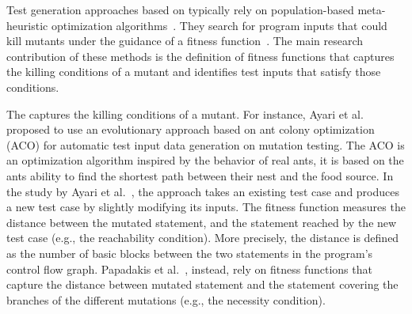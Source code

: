 Test generation approaches based on  typically rely on population-based meta-heuristic optimization algorithms~\cite{harman2011strong}. 
They search for program inputs that could kill mutants under the guidance of a fitness function~\cite{harman2011strong}. 
The main research contribution of these methods is the definition of fitness functions that captures the killing conditions of a mutant and identifies test inputs that satisfy those conditions.

The  captures the killing conditions of a mutant. For instance, Ayari et al.~\cite{ayari2007automatic} proposed to use an evolutionary approach based on ant colony optimization (ACO) for automatic test input data generation on mutation testing. The ACO is an optimization algorithm inspired by the behavior of real ants, it is based on the ants ability to find the shortest path between their nest and the food source. In the study by Ayari et al.~\cite{ayari2007automatic}, the approach takes an existing test case and produces a new test case by slightly modifying its inputs. 
The fitness function measures the distance between the mutated statement, and the statement reached by the new test case (e.g., the reachability condition). More precisely, the distance is defined as the number of basic blocks between the two statements in the program's control flow graph.
Papadakis et al.~\cite{papadakis2011automatically}, instead, rely on fitness functions that capture the distance between mutated statement and the statement covering the branches of the different mutations (e.g., the necessity condition).

